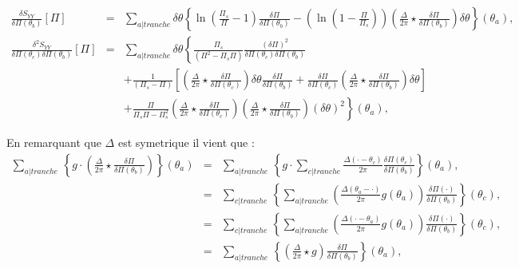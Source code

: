 	\begin{eqnarray}
			\frac{ \delta S_{YY} }{ \delta \Pi(\theta_b)} [\Pi ]  & = & \sum_{a\vert tranche}   \delta \theta \left \{ \ln \left ( \frac{ \Pi_s }{ \Pi} - 1 \right )\frac{\delta \Pi }{ \delta \Pi (\theta_b) } -  \left ( \ln \left ( 1 - \frac{ \Pi}{ \Pi_s}\right ) \right ) \left ( \frac{ \Delta}{2 \pi} \star \frac{\delta \Pi }{ \delta \Pi(\theta_b) }  \right)  \delta \theta \right \} ( \theta_	a ),\\
			\frac{ \delta^2 S_{YY} }{ \delta \Pi(\theta_c) \delta \Pi(\theta_b)  } [\Pi ]  & = & \sum_{a \vert tranche}   \delta \theta \left \{  \frac{\Pi_s}{(\Pi^2  - \Pi_s\Pi)} \frac{(\delta \Pi)^2}{ \delta \Pi(\theta_c) \delta \Pi(\theta_b)  } \right . \\
		&  &  +  \left . \frac{1 }{(\Pi_s -\Pi) } \left [ \left (  \frac{\Delta}{2\pi} \star\frac{\delta \Pi}{\delta \Pi(\theta_c)}   \right )   \delta \theta \frac{\delta \Pi}{\delta \Pi(\theta_b)}+ \frac{\delta \Pi}{\delta \Pi(\theta_c)} \left (  \frac{\Delta}{2\pi} \star\frac{\delta \Pi}{\delta \Pi(\theta_b)} \right )  \delta \theta  \right ] \right . \\
		& & + \left .  \frac{\Pi }{\Pi_s\Pi - \Pi_s^2 }\left (  \frac{\Delta}{2\pi} \star\frac{\delta \Pi}{\delta \Pi(\theta_c)} \right )\left (  \frac{\Delta}{2\pi} \star\frac{\delta \Pi}{\delta \Pi(\theta_b)} \right )   (\delta \theta)^2 \right \}(\theta_a),	
	\end{eqnarray}
	
%	
		
		En remarquant que $\Delta$ est symetrique il vient que : 
	\begin{eqnarray}
		\sum_{a\vert tranche}   \,  \left \{ g  \cdot  	\left  ( \frac{\Delta}{2\pi} \star  \frac{\delta \Pi}{\delta \Pi(\theta_b)} \right ) \right \}( \theta_a) & = & \sum_{a\vert tranche}   \,  \left \{ g  \cdot  \sum_{c\vert tranche}    	
		 \frac{\Delta ( \cdot - \theta_c)}{2\pi}  \frac{\delta \Pi (\theta_c) }{\delta \Pi(\theta_b)}\right \}( \theta_a),\\
		 & = & \sum_{c\vert tranche}   \,  \left \{  \sum_{a\vert tranche}      	
		  \left ( \frac{\Delta ( \theta_a - \cdot )}{2\pi}  g ( \theta_a) \right ) \frac{\delta \Pi (\cdot) }{\delta \Pi(\theta_b)}\right \}( \theta_c),\\
		  & = & \sum_{c\vert tranche}  \,  \left \{  \sum_{a\vert tranche}      	
		  \left ( \frac{\Delta ( \cdot - \theta_a)}{2\pi}  g ( \theta_a) \right ) \frac{\delta \Pi (\cdot) }{\delta \Pi(\theta_b)}\right \}( \theta_c),\\
		  & = & \sum_{a\vert tranche}   \,  \left \{        	
		  \left ( \frac{\Delta}{2\pi}   \star g \right ) \frac{\delta \Pi  }{\delta \Pi(\theta_b)}\right \}( \theta_a),\\
	\end{eqnarray}	
	
